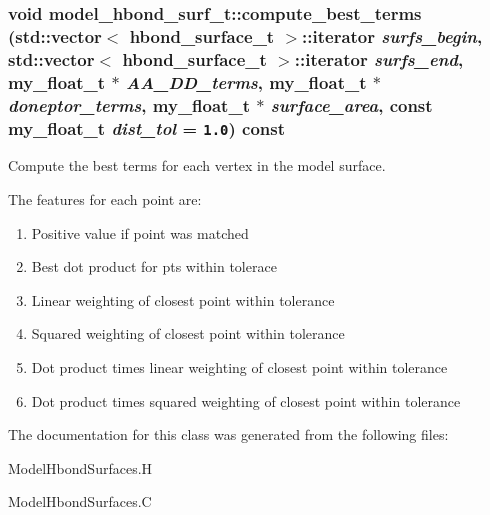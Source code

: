 \subsubsection{\setlength{\rightskip}{0pt plus 5cm}void model\_\-hbond\_\-surf\_\-t::compute\_\-best\_\-terms (std::vector$<$ \bf{hbond\_\-surface\_\-t} $>$::iterator {\em surfs\_\-begin}, std::vector$<$ \bf{hbond\_\-surface\_\-t} $>$::iterator {\em surfs\_\-end}, my\_\-float\_\-t $\ast$ {\em AA\_\-DD\_\-terms}, my\_\-float\_\-t $\ast$ {\em doneptor\_\-terms}, my\_\-float\_\-t $\ast$ {\em surface\_\-area}, const my\_\-float\_\-t {\em dist\_\-tol} = {\tt 1.0}) const}\label{classASCbase_1_1model__hbond__surf__t_a8ae4c19a792214f114129077475df01}


Compute the best terms for each vertex in the model surface. 

The features for each point are: \begin{enumerate}
\item Positive value if point was matched \item Best dot product for pts within tolerace \item Linear weighting of closest point within tolerance \item Squared weighting of closest point within tolerance \item Dot product times linear weighting of closest point within tolerance \item Dot product times squared weighting of closest point within tolerance \end{enumerate}


The documentation for this class was generated from the following files:\begin{CompactItemize}
\item 
Model\-Hbond\-Surfaces.H\item 
Model\-Hbond\-Surfaces.C\end{CompactItemize}
